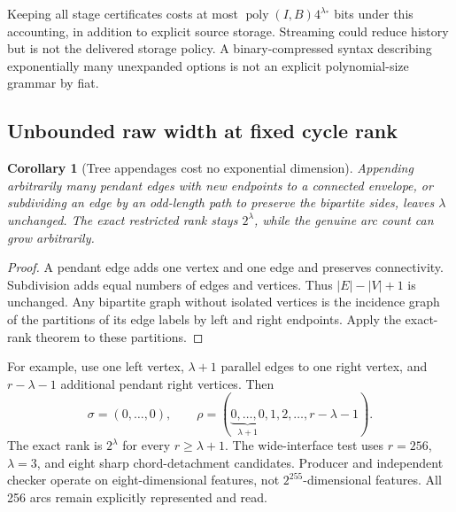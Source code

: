 \documentclass[11pt,a4paper]{article}
\newtheorem{corollary}[theorem]{Corollary}
\theoremstyle{definition}
\theoremstyle{remark}
\newcommand{\poly}{\operatorname{poly}}
\begin{document}
Keeping all stage certificates costs at most $\poly(I,B)4^{\lambda_*}$ bits under this
accounting, in addition to explicit source storage. Streaming could reduce history but is
not the delivered storage policy. A binary-compressed syntax describing exponentially many
unexpanded options is not an explicit polynomial-size grammar by fiat.

\subsection{Unbounded raw width at fixed cycle rank}
\begin{corollary}[Tree appendages cost no exponential dimension]\label{cor:wide}
Appending arbitrarily many pendant edges with new endpoints to a connected envelope,
or subdividing an edge by an odd-length path to preserve the bipartite sides, leaves
$\lambda$ unchanged. The exact restricted rank stays $2^\lambda$, while the genuine
arc count can grow arbitrarily.
\end{corollary}
\begin{proof}
A pendant edge adds one vertex and one edge and preserves connectivity. Subdivision adds
equal numbers of edges and vertices. Thus $|E|-|V|+1$ is unchanged. Any bipartite graph
without isolated vertices is the incidence graph of the partitions of its edge labels
by left and right endpoints. Apply the exact-rank theorem to these partitions.
\end{proof}

For example, use one left vertex, $\lambda+1$ parallel edges to one right vertex, and
$r-\lambda-1$ additional pendant right vertices. Then
\[
 \sigma=(0,\ldots,0),\qquad
 \rho=(\underbrace{0,\ldots,0}_{\lambda+1},1,2,\ldots,r-\lambda-1).
\]
The exact rank is $2^\lambda$ for every $r\ge\lambda+1$.
The wide-interface test uses $r=256$, $\lambda=3$, and eight sharp chord-detachment
candidates. Producer and independent checker operate on eight-dimensional features,
not $2^{255}$-dimensional features. All 256 arcs remain explicitly represented and read.
\end{document}
